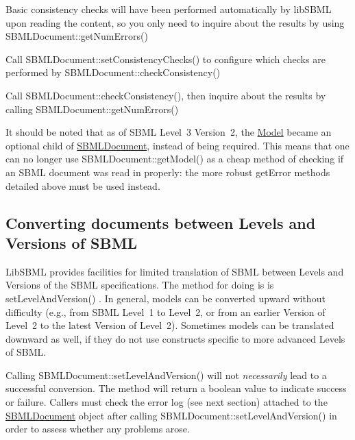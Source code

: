\begin{DoxyItemize}
\item Basic consistency checks will have been performed automatically by lib\+S\+B\+ML upon reading the content, so you only need to inquire about the results by using S\+B\+M\+L\+Document\+::get\+Num\+Errors()\end{DoxyItemize}
\begin{DoxyItemize}
\item Call S\+B\+M\+L\+Document\+::set\+Consistency\+Checks() to configure which checks are performed by S\+B\+M\+L\+Document\+::check\+Consistency()\end{DoxyItemize}
\begin{DoxyItemize}
\item Call S\+B\+M\+L\+Document\+::check\+Consistency(), then inquire about the results by calling S\+B\+M\+L\+Document\+::get\+Num\+Errors()\end{DoxyItemize}
It should be noted that as of S\+B\+ML Level~3 Version~2, the \hyperlink{class_model}{Model} became an optional child of \hyperlink{class_s_b_m_l_document}{S\+B\+M\+L\+Document}, instead of being required. This means that one can no longer use S\+B\+M\+L\+Document\+::get\+Model() as a cheap method of checking if an S\+B\+ML document was read in properly\+: the more robust get\+Error methods detailed above must be used instead.\hypertarget{class_s_b_m_l_document_converting}{}\subsection{Converting documents between Levels and Versions of S\+B\+ML}\label{class_s_b_m_l_document_converting}
Lib\+S\+B\+ML provides facilities for limited translation of S\+B\+ML between Levels and Versions of the S\+B\+ML specifications. The method for doing is is set\+Level\+And\+Version() . In general, models can be converted upward without difficulty (e.\+g., from S\+B\+ML Level~1 to Level~2, or from an earlier Version of Level~2 to the latest Version of Level~2). Sometimes models can be translated downward as well, if they do not use constructs specific to more advanced Levels of S\+B\+ML.

Calling S\+B\+M\+L\+Document\+::set\+Level\+And\+Version() will not {\itshape necessarily} lead to a successful conversion. The method will return a boolean value to indicate success or failure. Callers must check the error log (see next section) attached to the \hyperlink{class_s_b_m_l_document}{S\+B\+M\+L\+Document} object after calling S\+B\+M\+L\+Document\+::set\+Level\+And\+Version() in order to assess whether any problems arose.

